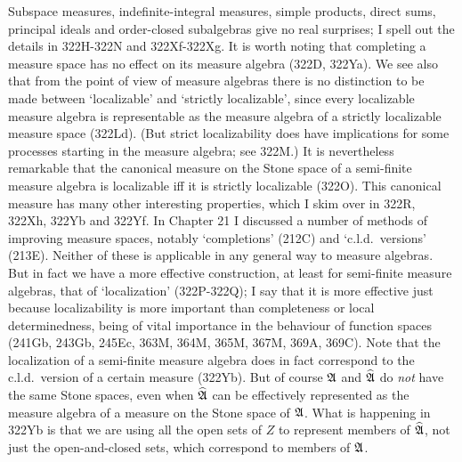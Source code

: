 {Subspace measures, indefinite-integral measures,
simple products, direct sums, principal ideals and
order-closed subalgebras give no real surprises;  I spell out the
details in 322H-322N %
and 322Xf-322Xg.   It is worth noting that completing a
measure space has no effect on its measure algebra (322D, 322Ya).   We
see also that
from the point of view of measure algebras there is no distinction to be
made between `localizable' and `strictly localizable', since every
localizable measure algebra is representable as the measure algebra of a
strictly localizable measure space (322Ld).   (But strict localizability
does have implications for some processes starting in the measure
algebra;  see 322M.)   It is nevertheless remarkable that the
canonical measure on the Stone space of a semi-finite measure algebra is
localizable iff it is strictly localizable (322O).   This canonical
measure has many other interesting properties, which I skim over in
322R, 322Xh, 322Yb and 322Yf.
In Chapter 21 I discussed a number of methods of improving measure
spaces, notably `completions' (212C) and `c.l.d.\ versions' (213E).
Neither of
these is applicable in any general way to measure algebras.   But in
fact we have a more effective construction, at least for
semi-finite measure algebras, that of `localization'
(322P-322Q);  I say that it is more effective just because
localizability is more important than completeness or local
determinedness, being of vital importance in the behaviour of function
spaces (241Gb, 243Gb, 245Ec, 363M,
364M, 365M, 367M, 369A, 369C).   Note that the localization of a
semi-finite
measure algebra does in fact correspond to the c.l.d.\ version of a
certain measure (322Yb).   But of course $\frak A$ and
$\widehat{\frak A}$ do
{\it not} have the same Stone spaces, even when $\widehat{\frak A}$ can
be effectively represented as the measure algebra of a measure on the
Stone space of $\frak A$.   What is happening in 322Yb is that we are
using all
the open sets of $Z$ to represent members of $\widehat{\frak A}$, not
just the open-and-closed sets, which correspond to members of $\frak A$.
}%

\discrpage

